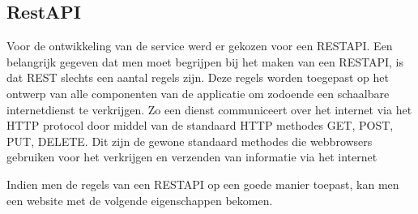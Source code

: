\documentclass[a4paper,11pt]{article}
\begin{document}
\subsection{RestAPI}
%
%
%

Voor de ontwikkeling van de service werd er gekozen voor een RESTAPI. Een belangrijk gegeven dat men moet begrijpen bij het maken van een RESTAPI, is dat REST slechts een aantal regels zijn. Deze regels worden toegepast op het ontwerp van alle componenten van de applicatie om zodoende een schaalbare internetdienst te verkrijgen. Zo een dienst communiceert over het internet via het HTTP protocol door middel van de standaard HTTP methodes GET, POST, PUT, DELETE. Dit zijn de gewone standaard methodes die webbrowsers gebruiken voor het verkrijgen en verzenden van informatie via het internet

Indien men de regels van een RESTAPI op een goede manier toepast, kan men een website met de volgende eigenschappen bekomen.
\end{document}
